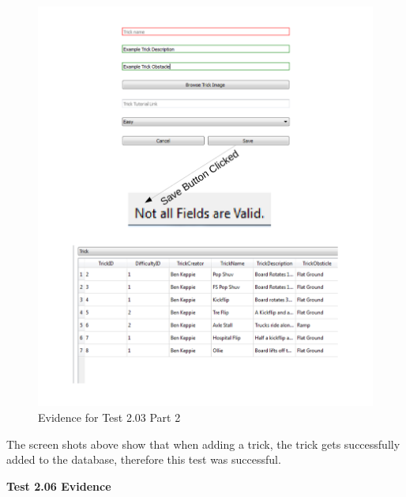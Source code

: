 \begin{figure}[H]
    \includegraphics[width=\textwidth]{./Testing/AnnotatedSamples/Test203p2.pdf}
    \caption{Evidence for Test 2.03 Part 2} \label{fig:Test 2.03 p2}
\end{figure}

The screen shots above show that when adding a trick, the trick gets successfully added to the database, therefore this test was successful.

\textbf{Test 2.06 Evidence}


